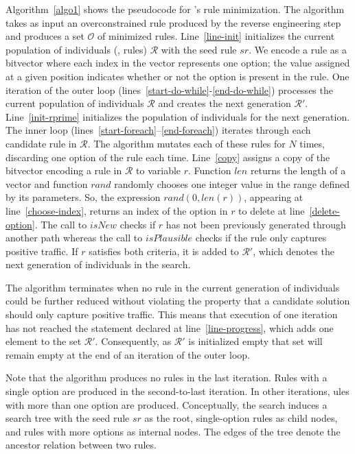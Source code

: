\documentclass[sigconf,review, anonymous]{acmart}
\begin{document}
Algorithm~\ref{algo1} shows the pseudocode for \tname{}'s rule
minimization. The algorithm takes as input an overconstrained rule
produced by the reverse engineering step and produces a set $\mathcal
O$ of minimized rules. Line~\ref{line-init} initializes the current
population of individuals (\ie{}, rules) $\mathcal{R}$ with the seed
rule $sr$. We encode a rule as a bitvector where each index in the
vector represents one option; the value assigned at a given position
indicates whether or not the option is present in the rule. One
iteration of the outer loop
(lines~\ref{start-do-while}-\ref{end-do-while}) processes the current
population of individuals $\mathcal R$ and creates the next generation
$\mathcal R'$. Line~\ref{init-rprime} initializes the population of
individuals for the next generation. The inner loop
(lines~\ref{start-foreach}--\ref{end-foreach}) iterates through each
candidate rule in $\mathcal R$. The algorithm mutates each of these
rules for $N$ times, discarding one option of the rule each
time. Line~\ref{copy} assigns a copy of the bitvector encoding a rule
in $\mathcal R$ to variable $r$. Function $\mathit{len}$ returns the
length of a vector and function $\mathit{rand}$ randomly chooses one
integer value in the range defined by its parameters. So, the
expression $\mathit{rand(0, len(r))}$, appearing at
line~\ref{choose-index}, returns an index of the option in $r$ to
delete at line~\ref{delete-option}. The call to $\mathit{isNew}$
checks if $r$ has not been previously generated through another path
whereas the call to $\mathit{isPlausible}$ checks if the rule only
captures positive traffic. If $r$ satisfies both criteria, it is added
to $\mathcal R'$, which denotes the next generation of individuals in
the search.

The algorithm terminates when no rule in the current
generation of individuals could be further reduced without violating
the property that a candidate solution should only capture positive
traffic. This means that execution of one iteration has not reached
the statement declared at line~\ref{line-progress}, which adds one
element to the set $\mathcal{R'}$. Consequently, as $\mathcal{R'}$ is
initialized empty that set will remain empty at the end of an
iteration of the outer loop.

Note that the algorithm produces no rules in the last iteration. Rules
with a single option are produced in the second-to-last iteration. In
other iterations, ules with more than one option are
produced. Conceptually, the search induces a search tree with the seed
rule $sr$ as the root, single-option rules as child nodes, and rules
with more options as internal nodes. The edges of the tree denote the
ancestor relation between two rules.
\end{document}
